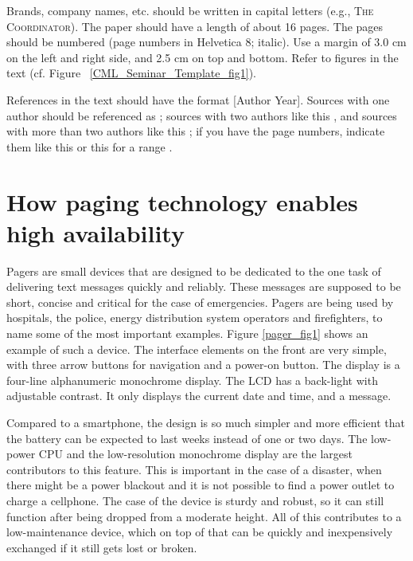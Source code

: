 \documentclass{CML_Seminar_Template}
\begin{document}
Brands, company names, etc. should be written in capital letters (e.g., \textsc{The Coordinator}). The paper should have a length of about 16 pages. The pages should be numbered (page numbers in Helvetica 8; italic). Use a margin of 3.0 cm on the left and right side, and 2.5 cm on top and bottom. Refer to figures in the text (cf. Figure ~\ref{CML_Seminar_Template_fig1}).




References in the text should have the format [Author Year]. Sources with one author should be referenced as \cite[]{Gro1995}; sources with two authors like this \cite[]{MaVa1984}, and sources with more than two authors like this \cite[]{Ham2002}; if you have the page numbers, indicate them like this \cite[p. 16]{Gro1995} or this for a range \cite[pp. 16-17]{Gro1995}. 

\section{How paging technology enables high availability}
Pagers are small devices that are designed to be dedicated to the one task of delivering text messages quickly and reliably. These messages are supposed to be short, concise and critical for the case of emergencies. Pagers are being used by hospitals, the police, energy distribution system operators and firefighters, to name some of the most important examples. Figure \ref{pager_fig1} shows an example of such a device. The interface elements on the front are very simple, with three arrow buttons for navigation and a power-on button. The display is a four-line alphanumeric monochrome display. The LCD has a back-light with adjustable contrast. It only displays the current date and time, and a message.
\par
Compared to a smartphone, the design is so much simpler and more efficient that the battery can be expected to last weeks instead of one or two days. The low-power CPU and the low-resolution monochrome display are the largest contributors to this feature. This is important in the case of a disaster, when there might be a power blackout and it is not possible to find a power outlet to charge a cellphone. The case of the device is sturdy and robust, so it can still function after being dropped from a moderate height. All of this contributes to a low-maintenance device, which on top of that can be quickly and inexpensively exchanged if it still gets lost or broken.
\end{document}
